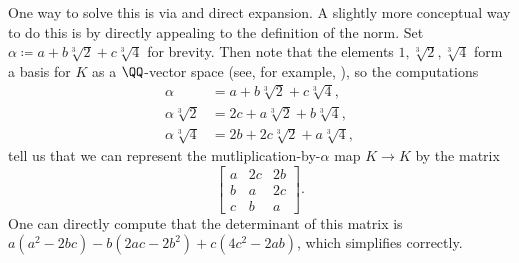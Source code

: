 \documentclass[../notes.tex]{subfiles}
\begin{document}
\begin{solution}
	One way to solve this is via  and direct expansion. A slightly more conceptual way to do this is by directly appealing to the definition of the norm. Set $\alpha\coloneqq a+b\sqrt[3]2+c\sqrt[3]4$ for brevity. Then note that the elements $1,\sqrt[3]2,\sqrt[3]4$ form a basis for $K$ as a $\QQ$-vector space (see, for example, ), so the computations
	\begin{align*}
		\alpha &= a+b\sqrt[3]2+c\sqrt[3]4, \\
		\alpha\sqrt[3]2 &= 2c+a\sqrt[3]2+b\sqrt[3]4, \\
		\alpha\sqrt[3]4 &= 2b+2c\sqrt[3]2+a\sqrt[3]4,
	\end{align*}
	tell us that we can represent the mutliplication-by-$\alpha$ map $K\to K$ by the matrix
	\[\begin{bmatrix}
		a & 2c & 2b \\
		b & a & 2c \\
		c & b & a
	\end{bmatrix}.\]
	One can directly compute that the determinant of this matrix is $a\left(a^2-2bc\right)-b\left(2ac-2b^2\right)+c\left(4c^2-2ab\right)$, which simplifies correctly.
\end{solution}
\end{document}
